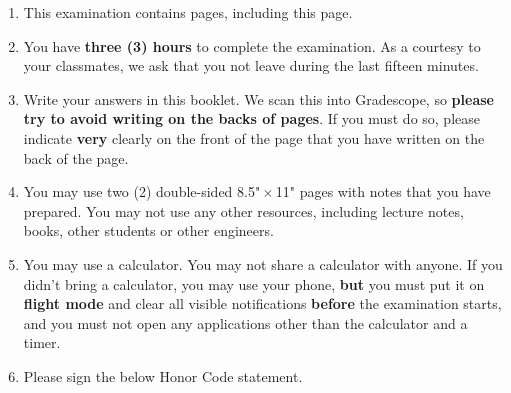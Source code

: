 \documentclass[]{exam}  %
\begin{document}
    \begin{enumerate}[label=\arabic*.]
        \item This examination contains \pageref{LastPage} pages, including this page.

        \item You have \textbf{three (3) hours} to complete the examination.  As a courtesy to your classmates, we ask that you not leave during the last fifteen minutes.

        \item Write your answers in this booklet.  We scan this into Gradescope, so \textbf{please try to avoid writing on the backs of pages}.  If you must do so, please indicate \textbf{very} clearly on the front of the page that you have written on the back of the page.

        \item You may use two (2) double-sided 8.5"\,$\times$\,11" pages with notes that you have prepared. You may not use any other resources, including lecture notes, books, other students or other engineers.

        \item You may use a calculator. You may not share a calculator with anyone.  If you didn’t bring a calculator, you may use your phone, \textbf{but} you must put it on \textbf{flight mode} and clear all visible notifications \textbf{before} the examination starts, and you must not open any applications other than the calculator and a timer.

        \item Please sign the below Honor Code statement.
    \end{enumerate}


    \clearpage

\fi


\end{document}
